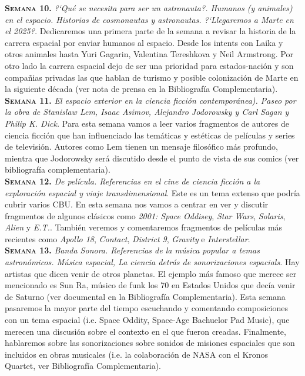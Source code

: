 \documentclass[letterpaper,10pt,onecolumn]{article}
\begin{document}
\noindent\textbf{\textsc{Semana 10.}} \textit{?`Qu\'e se necesita para ser un
astronauta?. Humanos (y animales) en el espacio. Historias  de
cosmonautas y astronautas. ?`Llegaremos a Marte en el 2025?.} Dedicaremos una primera parte de la semana a revisar la
historia de la carrera espacial por enviar humanos al espacio. Desde
los intents con Laika y otros animales hasta Yuri Gagarin, Valentina
Tereshkova y Neil Armstrong. Por otro lado la carrera espacial dejo de
ser una prioridad para estados-naci\'on y son compa\~nias privadas las
que hablan de turismo y posible colonizaci\'on de Marte en la
siguiente d\'ecada (ver nota de prensa en la Bibliograf\'ia
Complementaria). \\[-0.3cm]  

\noindent\textbf{\textsc{Semana 11.}} \textit{El espacio exterior en la
ciencia ficci\'on contempor\'anea). Paseo por la obra de Stanislaw Lem,
Isaac Asimov, Alejandro Jodorowsky y Carl Sagan y Philip K. Dick.}
Para esta semana vamos a leer varios fragmentos de  autores de ciencia
ficci\'on que han influenciado las  tem\'aticas y est\'eticas de
pel\'iculas y series de televisi\'on. Autores como Lem tienen un
mensaje filos\'ofico m\'as profundo, mientra que Jodorowsky ser\'a
discutido desde el punto de vista de sus comics (ver bibliograf\'ia
complementaria). \\[-0.3cm]  

\noindent\textbf{\textsc{Semana 12.}} \textit{De pel\'icula. Referencias en el
cine de ciencia ficci\'on a la exploraci\'on espacial y viaje
transdimensional}. Este es un tema extenso que podr\'ia cubrir varios
CBU. En esta semana nos vamos a centrar en ver y discutir fragmentos
de algunos cl\'asicos como \textit{2001: Space Oddisey}, \textit{Star
  Wars}, \textit{Solaris}, \textit{Alien} y 
\textit{E.T.}. Tambi\'en veremos y comentaremos fragmentos de
pel\'iculas m\'as recientes como \textit{Apollo 18}, \textit{Contact},
\textit{District 9}, \textit{Gravity} e
\textit{Interstellar}. \\[-0.3cm]    

\noindent\textbf{\textsc{Semana 13.}} \textit{Banda Sonora. Referencias de la
m\'usica popular a temas astron\'omicos. M\'usica espacial, La ciencia
detr\'as de sonorizaciones espacials.} Hay artistas que dicen venir de
otros planetas. El ejemplo m\'as famoso que merece ser mencionado es
Sun Ra, m\'usico de funk los 70 en Estados Unidos que dec\'ia venir de
Saturno (ver documental en la Bibliograf\'ia Complementaria). Esta
semana pasaremos la mayor parte del tiempo escuchando y comentando composiciones con
un tema espacial (i.e. Space Oddity, Space-Age Bachuelor Pad Music),
que merecen una discusi\'on sobre el contexto en el que fueron
creadas. Finalmente, hablaremos  sobre las sonorizaciones sobre
sonidos de misiones espaciales que son incluidos en obras musicales
(i.e. la colaboraci\'on de NASA con el Kronos Quartet, ver Bibliograf\'ia 
Complementaria).\\[-0.3cm]    
\end{document}
